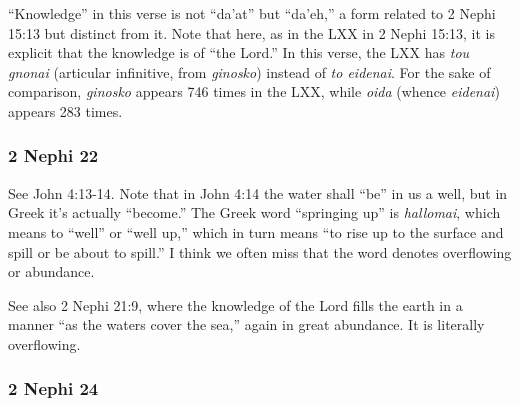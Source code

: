 		\begin{compactdesc}

		\item[9$\vert$]
		\begin{compactdesc}
		\item[knowledge] ``Knowledge'' in this verse is not ``da'at'' but ``da'eh,'' a form related to 2 Nephi 15:13 but distinct from it. Note that here, as in the LXX in 2 Nephi 15:13, it is explicit that the knowledge is of ``the Lord.'' In this verse, the LXX has \textit{tou gnonai} (articular infinitive, from \textit{ginosko}) instead of \textit{to eidenai}. For the sake of comparison, \textit{ginosko} appears 746 times in the LXX, while \textit{oida} (whence \textit{eidenai}) appears 283 times.
		\end{compactdesc}

		\end{compactdesc}

	\subsubsection{2 Nephi 22} %

		\begin{compactdesc}

		\item[3$\vert$]
		\begin{compactdesc}
		\item[Therefore, with joy shall ye draw water out of the wells of salvation] See John 4:13-14. Note that in John 4:14 the water shall ``be'' in us a well, but in Greek it's actually ``become.'' The Greek word ``springing up'' is \textit{hallomai}, which means to ``well'' or ``well up,'' which in turn means ``to rise up to the surface and spill or be about to spill.'' I think we often miss that the word denotes overflowing or abundance.

		See also 2 Nephi 21:9, where the knowledge of the Lord fills the earth in a manner ``as the waters cover the sea,'' again in great abundance. It is literally overflowing.
		\end{compactdesc}

		\end{compactdesc}

	\subsubsection{2 Nephi 24} %

